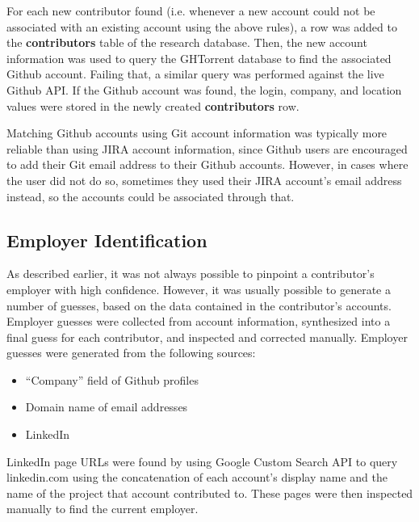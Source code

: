 For each new contributor found (i.e. whenever a new account could not be associated with an existing account using the above rules), a row was added to the \textbf{contributors} table of the research database. Then, the new account information was used to query the GHTorrent database to find the associated Github account. Failing that, a similar query was performed against the live Github API. If the Github account was found, the login, company, and location values were stored in the newly created \textbf{contributors} row.

Matching Github accounts using Git account information was typically more reliable than using JIRA account information, since Github users are encouraged to add their Git email address to their Github accounts. However, in cases where the user did not do so, sometimes they used their JIRA account's email address instead, so the accounts could be associated through that.
\subsection{Employer Identification}\label{employersec}
As described earlier, it was not always possible to pinpoint a contributor's employer with high confidence. However, it was usually possible to generate a number of guesses, 
based on the data contained in the contributor's accounts. Employer guesses were collected from account information, synthesized into a final guess for each contributor, and inspected and corrected manually.
Employer guesses were generated from the following sources:
\begin{itemize}
	\item ``Company'' field of Github profiles
	\item Domain name of email addresses
	\item LinkedIn
\end{itemize}
LinkedIn page URLs were found by using Google Custom Search API to query linkedin.com using the concatenation of each account's display name and the name of the project that account contributed to. These pages were then inspected manually to find the current employer. 

